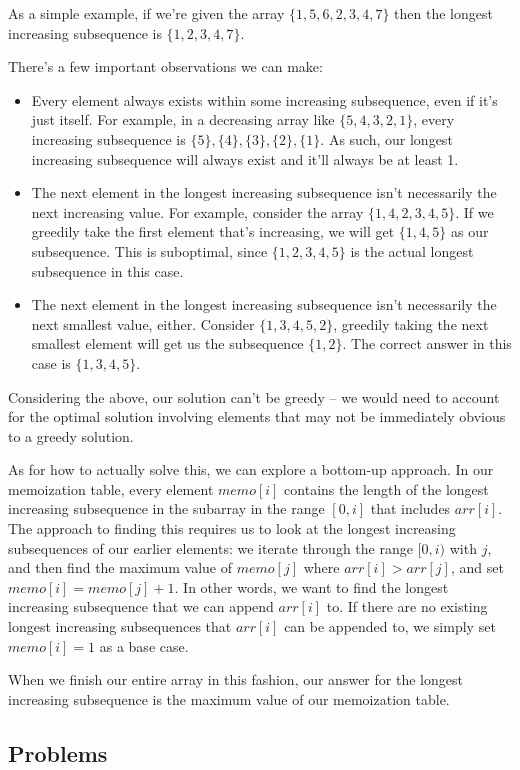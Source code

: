 As a simple example, if we're given the array $\{1,5,6,2,3,4,7\}$ then the longest increasing subsequence is $\{1,2,3,4,7\}$.

There's a few important observations we can make:
\begin{itemize}
\item Every element always exists within some increasing subsequence, even if it's just itself. For example, in a decreasing array like $\{5,4,3,2,1\}$, every increasing subsequence is $\{5\},\{4\},\{3\},\{2\},\{1\}$. As such, our longest increasing subsequence will always exist and it'll always be at least 1.
\item The next element in the longest increasing subsequence isn't necessarily the next increasing value. For example, consider the array $\{1,4,2,3,4,5\}$. If we greedily take the first element that's increasing, we will get $\{1,4,5\}$ as our subsequence. This is suboptimal, since $\{1,2,3,4,5\}$ is the actual longest subsequence in this case.
\item The next element in the longest increasing subsequence isn't necessarily the next smallest value, either. Consider $\{1,3,4,5,2\}$, greedily taking the next smallest element will get us the subsequence $\{1,2\}$. The correct answer in this case is $\{1,3,4,5\}$.
\end{itemize}

Considering the above, our solution can't be greedy -- we would need to account for the optimal solution involving elements that may not be immediately obvious to a greedy solution.

As for how to actually solve this, we can explore a bottom-up approach. In our memoization table, every element $memo[i]$ contains the length of the longest increasing subsequence in the subarray in the range $[0,i]$ that includes $arr[i]$. The approach to finding this requires us to look at the longest increasing subsequences of our earlier elements: we iterate through the range $[0,i)$ with $j$, and then find the maximum value of $memo[j]$ where $arr[i] > arr[j]$, and set $memo[i] = memo[j] + 1$. In other words, we want to find the longest increasing subsequence that we can append $arr[i]$ to. If there are no existing longest increasing subsequences that $arr[i]$ can be appended to, we simply set $memo[i] = 1$ as a base case.

When we finish our entire array in this fashion, our answer for the longest increasing subsequence is the maximum value of our memoization table.


\subsection{Problems}



\hrulefill



\hrulefill